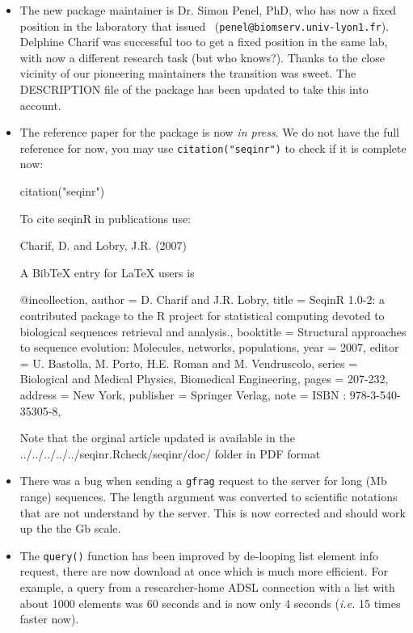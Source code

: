 \documentclass{article}
\begin{document}
\begin{itemize}
\item The new package maintainer is Dr. Simon Penel, PhD, who has now a fixed position in the
laboratory that issued \seqinr~(\texttt{penel@biomserv.univ-lyon1.fr}). Delphine Charif was
successful too to get a fixed position in the same lab, with now a different research task (but who knows?).
Thanks to the close vicinity of our pioneering maintainers the transition was sweet. The DESCRIPTION
file of the \seqinr{} package has been updated to take this into account.

\item The reference paper for the package is now \textit{in press}. We do not have the full
reference for now, you may use \texttt{citation("seqinr")} to check if it is complete now:
\begin{Schunk}
\begin{Sinput}
 citation("seqinr")
\end{Sinput}
\begin{Soutput}
To cite seqinR in publications use:

  Charif, D. and Lobry, J.R. (2007)

A BibTeX entry for LaTeX users is

  @incollection{,
    author = {D. Charif and J.R. Lobry},
    title = {Seqin{R} 1.0-2: a contributed package to the {R} project for statistical computing devoted to biological sequences retrieval and analysis.},
    booktitle = {Structural approaches to sequence evolution: Molecules, networks, populations},
    year = {2007},
    editor = {U. Bastolla, M. Porto, H.E. Roman and M. Vendruscolo},
    series = {Biological and Medical Physics, Biomedical Engineering},
    pages = {207-232},
    address = {New York},
    publisher = {Springer Verlag},
    note = {{ISBN :} 978-3-540-35305-8},
  }

Note that the orginal article updated is available in the
../../../../../seqinr.Rcheck/seqinr/doc/ folder in PDF format
\end{Soutput}
\end{Schunk}

\item There was a bug when sending a \texttt{gfrag} request to the server for long (Mb range) 
sequences. The length argument was converted to scientific notations that are not understand by the
server. This is now corrected and should work up the the Gb scale.

\item The \texttt{query()} function has been improved by de-looping list element info request,
there are now download at once which is much more efficient. For example, a query from a
researcher-home ADSL connection with a list with about 1000 elements was 60 seconds and
is now only 4 seconds (\textit{i.e.} 15 times faster now).


\end{itemize}
\end{document}
